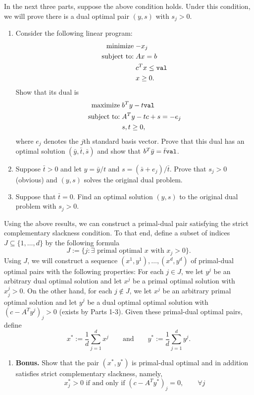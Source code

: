 \documentclass[12pt]{article}
\numberwithin{equation}{section}
\newcommand{\st}{\text{subject to:}}
\newcommand{\minimize}{\mathrm{minimize}}
\newcommand{\maximize}{\mathrm{maximize}}
\newcommand{\val}{{\rm \texttt{val}}}
\theoremstyle{remark}
\begin{document}
\begin{enumerate}
In the next three parts, suppose the above condition holds. Under this condition, we will prove there is a dual optimal pair $(y, s)$ with $s_j > 0$.
\begin{enumerate}[noitemsep]
\item Consider the following linear program:
$$
\begin{aligned}
\minimize &\; {- x_j} \\
\st &\; Ax = b\\
&\; c^T x \leq \val\\
&\;  x \geq 0.
\end{aligned}
$$
Show that its dual is
$$
\begin{aligned}
\maximize &\; b^Ty - t\val \\
\st &\; A^Ty - tc + s = -e_j\\
&\;  s, t \geq 0,
\end{aligned}
$$
where $e_j$ denotes the $j$th standard basis vector. Prove that this dual has an optimal solution $(\bar y, \bar t, \bar s)$ and show that  $b^T \bar y = \bar t \val$. 
\item Suppose $\bar t > 0$ and let $y = \bar y/t$ and $s = (\bar s + e_j)/\bar t$. Prove that $s_j > 0$ (obvious) and $(y, s)$ solves the original dual problem.
\item Suppose that $\bar t = 0$. Find an optimal solution $(y, s)$ to the original dual problem with  $s_j > 0$. 
\end{enumerate}

Using the above results, we can construct a primal-dual pair satisfying the strict complementary slackness condition. To that end, define a subset of indices $J \subseteq \{1, \ldots, d\}$ by the following formula
$$
J := \{j  \colon \exists \text{ primal optimal $x$ with $x_j > 0$}\}.
$$
Using $J$, we will construct a sequence $(x^1, y^1), \ldots, (x^d, y^d)$ of primal-dual optimal pairs with the following properties: For each $j \in J$, we let $y^j$ be an arbitrary dual optimal solution and let $x^j$ be a primal optimal solution with $x^j_j > 0$. On the other hand, for each $j \notin J$, we let $x^j$ be an arbitrary primal optimal solution and let $y^j$ be a dual optimal optimal solution with $(c - A^Ty^j)_j > 0$ (exists by Parts 1-3). Given these primal-dual optimal pairs, define
$$
x^\ast := \frac{1}{d}\sum_{j=1}^d x^j \qquad \text{and} \qquad y^\ast := \frac{1}{d}\sum_{j = 1}^d y^j.
$$
\begin{enumerate}[resume]
\item {\bf Bonus.} Show that the pair $(x^\ast, y^\ast)$ is primal-dual optimal and in addition satisfies  strict complementary slackness, namely, 
$$
x_j^\ast > 0 \text{ if and only if } (c - A^Ty^\ast)_j = 0, \qquad \forall j
$$
\end{enumerate}


\end{enumerate}
\end{document}
